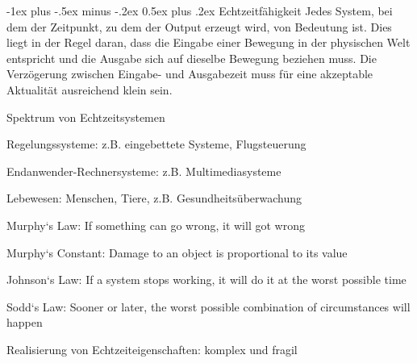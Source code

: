 \documentclass[a4paper]{article}
\makeatletter
\renewcommand{\section}{\@startsection{section}{1}{0mm}%
 {-1ex plus -.5ex minus -.2ex}%
 {0.5ex plus .2ex}%
 {\normalfont\large\bfseries}}
\makeatother
\begin{document}
\begin{multicols}{3}
    \section{Echtzeitfähigkeit}
    Jedes System, bei dem der Zeitpunkt, zu dem der Output erzeugt wird, von Bedeutung ist. Dies liegt in der Regel daran, dass die Eingabe einer Bewegung in der physischen Welt entspricht und die Ausgabe sich auf dieselbe Bewegung beziehen muss. Die Verzögerung zwischen Eingabe- und Ausgabezeit muss für eine akzeptable Aktualität ausreichend klein sein.

    Spektrum von Echtzeitsystemen
    \begin{enumerate*}
        \item Regelungssysteme: z.B. eingebettete Systeme, Flugsteuerung
        \item Endanwender-Rechnersysteme: z.B. Multimediasysteme
        \item Lebewesen: Menschen, Tiere, z.B. Gesundheitsüberwachung
    \end{enumerate*}
    \begin{itemize*}
        \item Murphy`s Law: If something can go wrong, it will got wrong
        \item Murphy`s Constant: Damage to an object is proportional to its value
        \item Johnson`s Law: If a system stops working, it will do it at the worst possible time
        \item Sodd`s Law: Sooner or later, the worst possible combination of circumstances will happen
        \item Realisierung von Echtzeiteigenschaften: komplex und fragil
    \end{itemize*}


\end{multicols}
\end{document}

